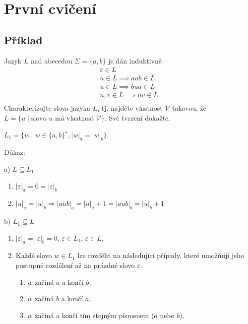 \section{První cvičení}

\subsection{Příklad}
Jazyk $L$ nad abecedou $\Sigma = \{a,b\}$ je dán induktivně
\begin{gather*}
    \varepsilon \in L \\
    u \in L \implies aub \in L\\
    u \in L \implies bua \in L\\
    u, v \in L \implies uv \in L\\
\end{gather*}
Charakterizujte slova jazyka $L$, tj. najděte vlastnost $\mathcal{V}$ takovou, že $L = \{u \mid \text{slovo } u 
\text{ má vlastnost } \mathcal{V}\}$. Své tvrzení dokažte.

$L_1 = \{w \mid w \in \{a,b\}^\star, |w|_a=|w|_b\}$.

Důkaz:

a) $L \subseteq L_1$

\begin{enumerate}
    \item $|\varepsilon|_a = 0 = |\varepsilon|_b$
    \item $|u|_a = |u|_b \Rightarrow |aub|_a = |u|_a + 1 = |aub|_b = |u|_b + 1$
\end{enumerate}

b) $L_1 \subseteq L$

\begin{enumerate}
    \item $|\varepsilon|_a = |\varepsilon|_b = 0$, $\varepsilon \in L_1$, $\varepsilon \in L$. 
    \item Každé slovo $w \in L_1$ lze rozdělit na následující případy, které umožňují jeho postupné rozdělení až na 
    prázdné slovo $\varepsilon$: 
    \begin{enumerate}[label={}, noitemsep]
        \item {} $w$ začíná $a$ a končí $b$, 
        \item {} $w$ začíná $b$ a končí $a$, 
        \item {} $w$ začíná a končí tím stejným písmenem ($a$ nebo $b$). 
    \end{enumerate}
\end{enumerate}

